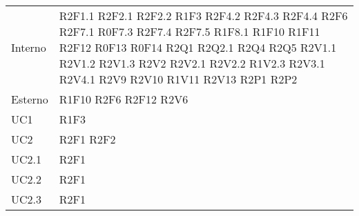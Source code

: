 \begin{center}
\begin{longtable}{  p{5cm} p{5cm} }
		Interno & R2F1.1 \newline R2F2.1 \newline R2F2.2 \newline R1F3 \newline R2F4.2 \newline R2F4.3 \newline R2F4.4 \newline R2F6 \newline R2F7.1 \newline R0F7.3 \newline R2F7.4 \newline R2F7.5 \newline R1F8.1 \newline R1F10 \newline R1F11 \newline R2F12 \newline R0F13 \newline R0F14 \newline R2Q1 \newline R2Q2.1 \newline R2Q4 \newline R2Q5 \newline R2V1.1 \newline R2V1.2 \newline R2V1.3 \newline R2V2 \newline R2V2.1 \newline R2V2.2 \newline R1V2.3 \newline R2V3.1 \newline R2V4.1 \newline R2V9 \newline R2V10 \newline R1V11 \newline R2V13 \newline R2P1 \newline R2P2 \\
		Esterno	& R1F10 \newline R2F6 \newline R2F12 \newline R2V6 \\
		UC1 & R1F3 \\
		UC2 & R2F1 \newline R2F2 \\
		UC2.1 & R2F1\\
		UC2.2 & R2F1\\
		UC2.3 & R2F1\\

\end{longtable}
\end{center}
